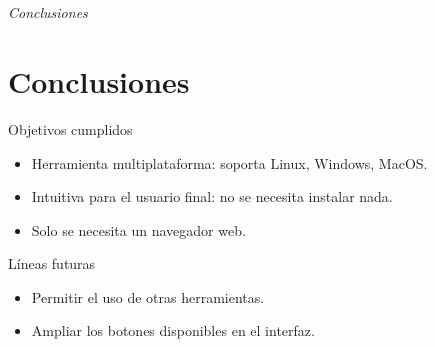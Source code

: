 \documentclass{beamer}
\begin{document}
\section*{}
\begin{frame}{}
  \centering \Huge
  \emph{Conclusiones}
\end{frame}

\section{Conclusiones}
\begin{frame}
\begin{block}{Objetivos cumplidos}
\begin{itemize}
\item Herramienta multiplataforma: soporta Linux, Windows, MacOS.
\item Intuitiva para el usuario final: no se necesita instalar nada.
\item Solo se necesita un navegador web.
\end{itemize}
\end{block}

\begin{block}{Líneas futuras}
\begin{itemize}
\item Permitir el uso de otras herramientas.
\item Ampliar los botones disponibles en el interfaz.
\end{itemize}
\end{block}
\end{frame}

\begin{frame}[plain]
\large{\titlepage}
\end{frame}
\end{document}
